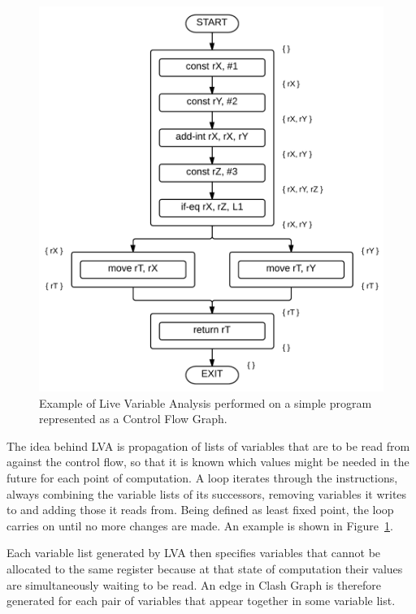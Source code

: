 \documentclass[12pt,twoside,notitlepage]{report}
\begin{document}
\begin{figure}
	\centerline{	
		\includegraphics[height=0.42\textheight]{figs/fig_implementation_lva.png}
	}
	\caption{Example of Live Variable Analysis performed on a simple program represented as a Control Flow Graph.}
	\label{fig:Implementation_LVA}
\end{figure}

The idea behind LVA is propagation of lists of variables that are to be read from against the control flow, so that it is known which values might be needed in the future for each point of computation. A loop iterates through the instructions, always combining the variable lists of its successors, removing variables it writes to and adding those it reads from. Being defined as least fixed point, the loop carries on until no more changes are made. An example is shown in Figure~\ref{fig:Implementation_LVA}.

Each variable list generated by LVA then specifies variables that cannot be allocated to the same register because at that state of computation their values are simultaneously waiting to be read. An edge in Clash Graph is therefore generated for each pair of variables that appear together in some variable list.
\end{document}
